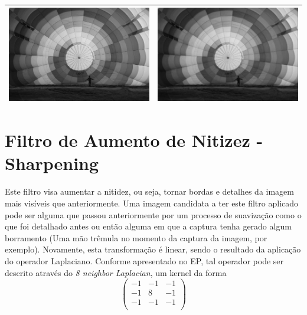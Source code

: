 \documentclass[brazil,times]{abnt}
\begin{document}
\begin{table}[ht]
\begin{tabular}{|c|c|}
			\includegraphics[scale=0.4]{imagens/baloon.JPG}&\includegraphics[scale=0.4]{imagens/baloon-blur.jpg}\\
			\hline
			\end{tabular}
			\label{tab:gt}
			\end{table}


	\section{Filtro de Aumento de Nitizez - Sharpening}
		Este filtro visa aumentar a nitidez, ou seja, tornar bordas e detalhes da imagem mais visíveis que anteriormente. Uma imagem candidata a ter este filtro aplicado pode ser alguma que passou anteriormente por um processo de suavização como o que foi detalhado antes ou então alguma em que a captura tenha gerado algum borramento (Uma mão trêmula no momento da captura da imagem, por exemplo). Novamente, esta transformação é linear, sendo o resultado da aplicação do operador Laplaciano. Conforme apresentado no EP, tal operador pode ser descrito através do \emph{8 neighbor Laplacian}, um kernel da forma
\[
 \begin{pmatrix}
  -1 & -1 & -1 \\
  -1 & 8 & -1 \\
  -1 & -1 & -1 \\
 \end{pmatrix}
\]		
\end{document}
